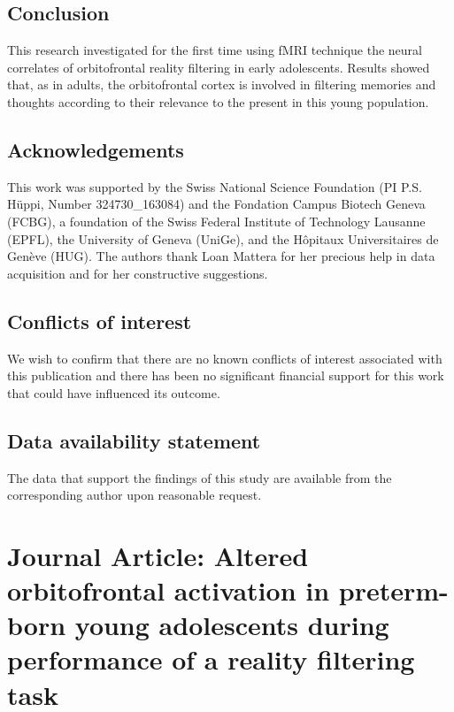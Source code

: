 \subsection{Conclusion}

This research investigated for the first time using fMRI technique the neural correlates of orbitofrontal reality filtering in early adolescents. Results showed that, as in adults, the orbitofrontal cortex is involved in filtering memories and thoughts according to their relevance to the present in this young population. 







\subsection*{Acknowledgements}

This work was supported by the Swiss National Science Foundation (PI P.S. Hüppi, Number 324730\_163084) and the Fondation Campus Biotech Geneva (FCBG), a foundation of the Swiss Federal Institute of Technology Lausanne (EPFL), the University of Geneva (UniGe), and the Hôpitaux Universitaires de Genève (HUG). The authors thank Loan Mattera for her precious help in data acquisition and for her constructive suggestions.

\subsection*{Conflicts of interest}

We wish to confirm that there are no known conflicts of interest associated with this publication and there has been no significant financial support for this work that could have influenced its outcome. 

\subsection*{Data availability statement}

The data that support the findings of this study are available from the corresponding author upon reasonable request.



\newpage
\section{Journal Article: Altered orbitofrontal activation in preterm-born young adolescents during performance of a reality filtering task} \label{section:ch4_orfi_groups}

